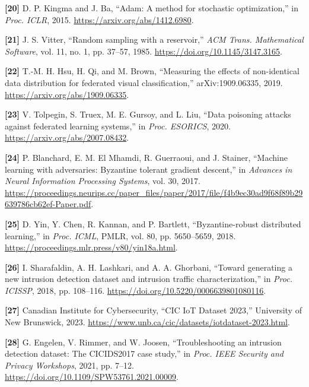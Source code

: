 \documentclass[10pt,a4paper]{article}
\begin{document}
\par\noindent\textbf{[20]}  D. P. Kingma and J. Ba, ``Adam: A method for stochastic optimization,'' in \emph{Proc. ICLR}, 2015. \url{https://arxiv.org/abs/1412.6980}.

\par\noindent\textbf{[21]}  J. S. Vitter, ``Random sampling with a reservoir,'' \emph{ACM Trans. Mathematical Software}, vol. 11, no. 1, pp. 37--57, 1985. \url{https://doi.org/10.1145/3147.3165}.

\par\noindent\textbf{[22]}  T.-M. H. Hsu, H. Qi, and M. Brown, ``Measuring the effects of non-identical data distribution for federated visual classification,'' arXiv:1909.06335, 2019. \url{https://arxiv.org/abs/1909.06335}.

\par\noindent\textbf{[23]}  V. Tolpegin, S. Truex, M. E. Gursoy, and L. Liu, ``Data poisoning attacks against federated learning systems,'' in \emph{Proc. ESORICS}, 2020. \url{https://arxiv.org/abs/2007.08432}.


\par\noindent\textbf{[24]}  P. Blanchard, E. M. El Mhamdi, R. Guerraoui, and J. Stainer, ``Machine learning with adversaries: Byzantine tolerant gradient descent,'' in \emph{Advances in Neural Information Processing Systems}, vol. 30, 2017. \url{https://proceedings.neurips.cc/paper_files/paper/2017/file/f4b9ec30ad9f68f89b29639786cb62ef-Paper.pdf}.


\par\noindent\textbf{[25]}  D. Yin, Y. Chen, R. Kannan, and P. Bartlett, ``Byzantine-robust distributed learning,'' in \emph{Proc. ICML}, PMLR, vol. 80, pp. 5650--5659, 2018. \url{https://proceedings.mlr.press/v80/yin18a.html}.

\par\noindent\textbf{[26]}  I. Sharafaldin, A. H. Lashkari, and A. A. Ghorbani, ``Toward generating a new intrusion detection dataset and intrusion traffic characterization,'' in \emph{Proc. ICISSP}, 2018, pp. 108--116. \url{https://doi.org/10.5220/0006639801080116}.

\par\noindent\textbf{[27]}  Canadian Institute for Cybersecurity, ``CIC IoT Dataset 2023,'' University of New Brunswick, 2023. \url{https://www.unb.ca/cic/datasets/iotdataset-2023.html}.

\par\noindent\textbf{[28]}  G. Engelen, V. Rimmer, and W. Joosen, ``Troubleshooting an intrusion detection dataset: The CICIDS2017 case study,'' in \emph{Proc. IEEE Security and Privacy Workshops}, 2021, pp. 7--12. \url{https://doi.org/10.1109/SPW53761.2021.00009}.
\end{document}
